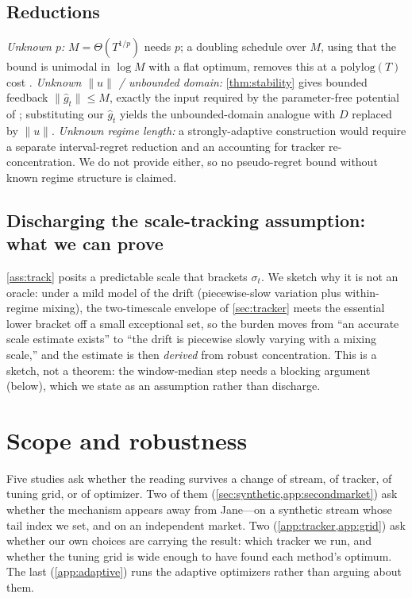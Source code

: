 \documentclass{article}
\newcommand{\norm}[1]{\lVert #1 \rVert}
\begin{document}
\subsection{Reductions}
\label{app:reductions}
\emph{Unknown $p$:} $M=\Theta(T^{1/p})$ needs $p$; a doubling schedule over $M$, using
that the bound is unimodal in $\log M$ with a flat optimum, removes this at a
$\mathrm{polylog}(T)$ cost \citep{liu2026oco}. \emph{Unknown $\norm u$ / unbounded
domain:} \cref{thm:stability} gives bounded feedback $\norm{\hat g_t}\le M$, exactly
the input required by the parameter-free potential of \citet{zhangcutkosky2022};
substituting our $\hat g_t$ yields the unbounded-domain analogue with $D$ replaced by
$\norm u$. \emph{Unknown regime length:} a strongly-adaptive construction would require a
separate interval-regret reduction and an accounting for tracker re-concentration. We do not
provide either, so no pseudo-regret bound without known regime structure is claimed.

\subsection{Discharging the scale-tracking assumption: what we can prove}
\label{app:bracket}

\cref{ass:track} posits a predictable scale that brackets $\sigma_t$. We sketch why it is
not an oracle: under a mild model of the drift (piecewise-slow variation plus within-regime
mixing), the two-timescale envelope of \cref{sec:tracker} meets the essential lower bracket
off a small exceptional set, so the burden moves from ``an accurate scale estimate exists''
to ``the drift is piecewise slowly varying with a mixing scale,'' and the estimate is then
\emph{derived} from robust concentration. This is a sketch, not a theorem: the
window-median step needs a blocking argument (below), which we state as an assumption rather
than discharge.

\section{Scope and robustness}
\label{app:scope}

Five studies ask whether the reading survives a change of stream, of tracker, of tuning
grid, or of optimizer. Two of them (\cref{sec:synthetic,app:secondmarket}) ask whether the
mechanism appears away from Jane---on a synthetic stream whose tail index we set, and on an
independent market. Two (\cref{app:tracker,app:grid}) ask whether our own choices are
carrying the result: which tracker we run, and whether the tuning grid is wide enough to
have found each method's optimum. The last (\cref{app:adaptive}) runs the adaptive
optimizers rather than arguing about them.
\end{document}
